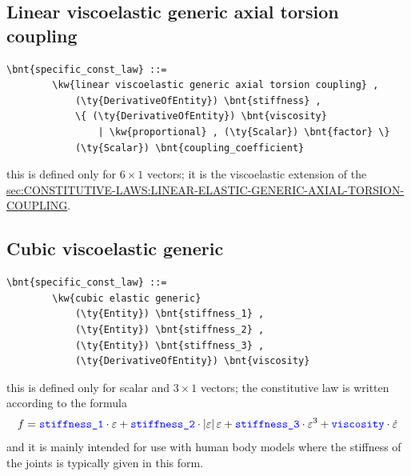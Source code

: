 \subsection{Linear viscoelastic generic axial torsion coupling}
\begin{Verbatim}[commandchars=\\\{\}]
    \bnt{specific_const_law} ::= 
        \kw{linear viscoelastic generic axial torsion coupling} ,
            (\ty{DerivativeOfEntity}) \bnt{stiffness} ,
            \{ (\ty{DerivativeOfEntity}) \bnt{viscosity} 
                | \kw{proportional} , (\ty{Scalar}) \bnt{factor} \}
            (\ty{Scalar}) \bnt{coupling_coefficient}
\end{Verbatim}
this is defined only for $6 \times 1$ vectors; it is the viscoelastic 
extension of the 
\hyperref{\kw{linear elastic generic axial torsion coupling} constitutive law}{\kw{linear elastic generic axial torsion coupling} constitutive law (see Section~}{)}{sec:CONSTITUTIVE-LAWS:LINEAR-ELASTIC-GENERIC-AXIAL-TORSION-COUPLING}.


\subsection{Cubic viscoelastic generic}
\begin{Verbatim}[commandchars=\\\{\}]
    \bnt{specific_const_law} ::= 
        \kw{cubic elastic generic}
            (\ty{Entity}) \bnt{stiffness_1} ,
            (\ty{Entity}) \bnt{stiffness_2} ,
            (\ty{Entity}) \bnt{stiffness_3} ,
            (\ty{DerivativeOfEntity}) \bnt{viscosity}
\end{Verbatim}
this is defined only for scalar and $3 \times 1$ vectors; the constitutive
law is written according to the formula
\begin{displaymath}
	f = \textcolor{blue}{\texttt{stiffness\_1}} \cdot \varepsilon
	+ \textcolor{blue}{\texttt{stiffness\_2}} \cdot \left| \varepsilon \right|\varepsilon
	+ \textcolor{blue}{\texttt{stiffness\_3}} \cdot \varepsilon^3
	+ \textcolor{blue}{\texttt{viscosity}} \cdot \dot{\varepsilon}
\end{displaymath}
and it is mainly intended for use with human body models 
where the stiffness of the joints is typically given in this form.

